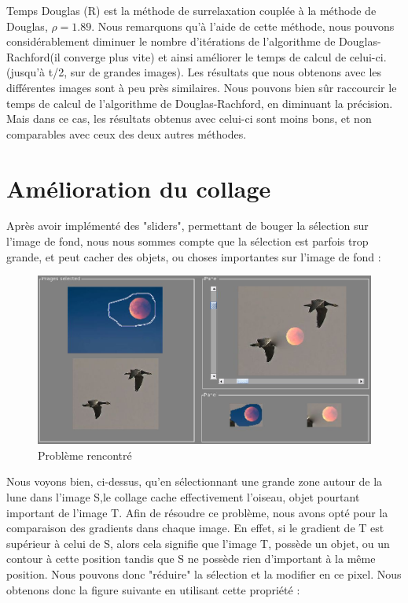 Temps Douglas (R) est la méthode de surrelaxation couplée à la méthode de Douglas, $\rho = 1.89$. Nous remarquons qu'à l'aide de cette méthode, nous pouvons considérablement diminuer le nombre d'itérations de l'algorithme de Douglas-Rachford(il converge plus vite) et ainsi améliorer le temps de calcul de celui-ci. (jusqu'à t/2, sur de grandes images).
Les résultats que nous obtenons avec les différentes images sont à peu près similaires. Nous pouvons bien sûr raccourcir le temps de calcul de l'algorithme de Douglas-Rachford, en diminuant la précision. Mais dans ce cas, les résultats obtenus avec celui-ci sont moins bons, et non comparables avec ceux des deux autres méthodes. 
\section{Amélioration du collage}
Après avoir implémenté des "sliders", permettant de bouger la sélection sur l'image de fond, nous nous sommes compte que la sélection est parfois trop grande, et peut cacher des objets, ou choses importantes sur l'image de fond : 
\begin{figure}[!htb]
\centering
\includegraphics[scale=0.25]{Images/pb.png}
\caption{Problème rencontré}
\end{figure}
Nous voyons bien, ci-dessus, qu'en sélectionnant une grande zone autour de la lune dans l'image S,le collage cache effectivement l'oiseau, objet pourtant important de l'image T. Afin de résoudre ce problème, nous avons opté pour la comparaison des gradients dans chaque image. En effet, si le gradient de T est supérieur à celui de S, alors cela signifie que l'image T, possède un objet, ou un contour à cette position tandis que S ne possède rien d'important à la même position. Nous pouvons donc "réduire" la sélection et la modifier en ce pixel. Nous obtenons donc la figure suivante en utilisant cette propriété :
